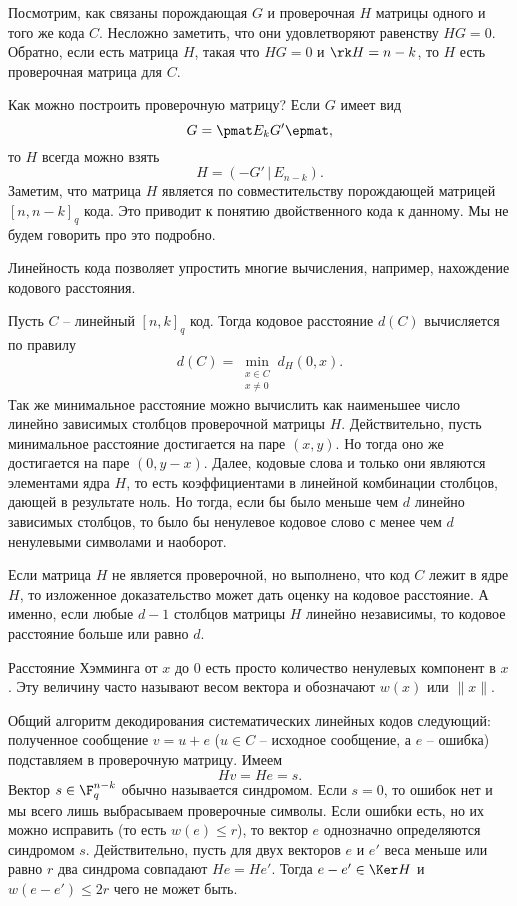Посмотрим, как связаны порождающая $G$ и проверочная $H$ матрицы одного и того же кода $C$. Несложно заметить, что они удовлетворяют равенству $HG=0$. Обратно, если есть матрица $H$, такая что $HG=0$ и $\rk H=n-k$, то $H$ есть проверочная матрица для $C$.

Как можно построить проверочную матрицу? Если $G$ имеет вид
$$G= \pmat E_k\\ G' \epmat,$$
то $H$ всегда можно взять 
$$H=(-G'\,|\,E_{n-k}).$$
Заметим, что матрица $H$ является по совместительству порождающей матрицей $[n,n-k]_q$ кода. Это приводит к понятию двойственного кода к данному. Мы не будем говорить про это подробно.

Линейность кода позволяет упростить многие вычисления, например, нахождение кодового расстояния.



\lm Пусть $C$ -- линейный $[n,k]_q$ код. Тогда кодовое расстояние $d(C)$ вычисляется по правилу 
$$d(C)=\min_{\substack{x \in C \\ x\neq 0} } d_H(0,x).$$
Так же минимальное расстояние можно вычислить как наименьшее число линейно зависимых столбцов проверочной матрицы $H$.
\proof
Действительно, пусть минимальное расстояние достигается на паре $(x,y)$. Но тогда оно же достигается на паре $(0,y-x)$. Далее, кодовые слова и только они являются элементами ядра $H$, то есть коэффициентами в линейной комбинации столбцов, дающей в результате ноль. Но тогда, если бы было меньше чем $d$ линейно зависимых столбцов, то было бы  ненулевое кодовое слово с менее чем $d$ ненулевыми символами и наоборот. 
\endproof
\elm

\rm Если матрица $H$ не является проверочной, но выполнено, что код $C$ лежит в ядре $H$, то изложенное доказательство может дать оценку на кодовое расстояние. А именно, если любые $d-1$ столбцов матрицы $H$ линейно независимы, то кодовое расстояние больше или равно $d$. 
\erm 

\rm Расстояние Хэмминга от $x$ до $0$ есть просто количество ненулевых компонент в $x$. Эту величину часто называют весом вектора и обозначают $w(x)$ или $\|x\|$.
\erm 

Общий алгоритм декодирования систематических линейных кодов следующий: полученное сообщение $v= u+e$ ($u\in C$ -- исходное сообщение, а $e$ -- ошибка) подставляем в проверочную матрицу. Имеем 
$$Hv= He=s.$$
Вектор $s\in \F_q^{n-k}$ обычно называется синдромом. Если $s=0$, то ошибок нет и мы всего лишь выбрасываем проверочные символы. Если ошибки есть, но их можно исправить (то есть $w(e)\leq r$), то вектор $e$ однозначно определяются синдромом $s$. Действительно, пусть для двух векторов $e$ и $e'$ веса меньше или равно $r$ два синдрома совпадают $He=He'$. Тогда $e-e'\in \Ker H$ и $w(e-e')\leq 2r$ чего не может быть.

